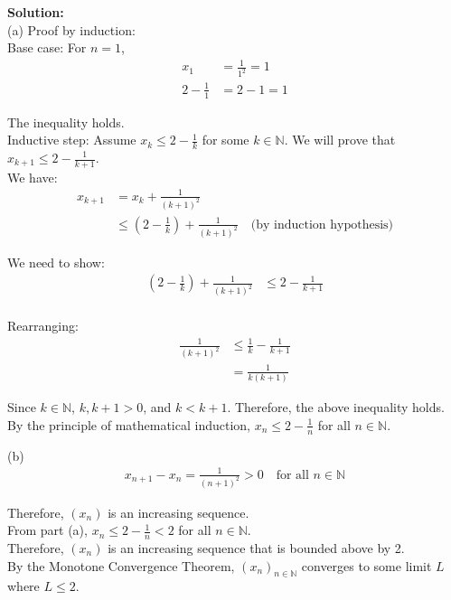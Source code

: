 \documentclass{article}
\begin{document}
\textbf{Solution:} \\

(a) Proof by induction: \\

Base case: For $n = 1$,
\begin{align*}
x_1 &= \frac{1}{1^2} = 1\\
2 - \frac{1}{1} &= 2 - 1 = 1
\end{align*}

The inequality holds. \\

Inductive step: Assume $x_k \leq 2 - \frac{1}{k}$ for some $k \in \mathbb{N}$.
We will prove that $x_{k+1} \leq 2 - \frac{1}{k+1}$. \\

We have:
\begin{align*}
x_{k+1} &= x_k + \frac{1}{(k+1)^2}\\
&\leq \left(2 - \frac{1}{k}\right) + \frac{1}{(k+1)^2} \quad \text{(by induction hypothesis)}
\end{align*}

We need to show:
\begin{align*}
\left(2 - \frac{1}{k}\right) + \frac{1}{(k+1)^2} &\leq 2 - \frac{1}{k+1}\\
\end{align*}

Rearranging:
\begin{align*}
\frac{1}{(k+1)^2} &\leq \frac{1}{k} - \frac{1}{k+1}\\
&= \frac{1}{k(k+1)}
\end{align*}

Since $k \in \mathbb{N}$, $k, k+1 > 0$, and $k < k+1$. Therefore, the above inequality holds. By the principle of mathematical induction, $x_n \leq 2 - \frac{1}{n}$ for all $n \in \mathbb{N}$.

(b) 
\begin{align*}
x_{n+1} - x_n = \frac{1}{(n+1)^2} > 0 \quad \text{for all } n \in \mathbb{N}
\end{align*}

Therefore, $(x_n)$ is an increasing sequence. \\

From part (a), $x_n \leq 2 - \frac{1}{n} < 2$ for all $n \in \mathbb{N}$. \\

Therefore, $(x_n)$ is an increasing sequence that is bounded above by 2. \\

By the Monotone Convergence Theorem, $(x_n)_{n \in \mathbb{N}}$ converges to some limit $L$ where $L \leq 2$.
\end{document}
